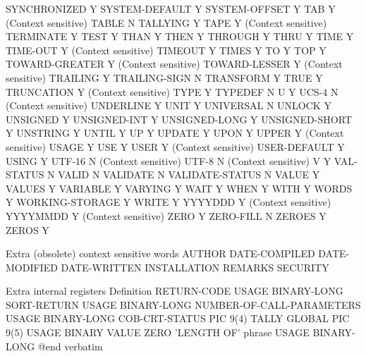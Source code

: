 SYNCHRONIZED			Y
SYSTEM-DEFAULT			Y
SYSTEM-OFFSET			Y
TAB				Y (Context sensitive)
TABLE				N
TALLYING			Y
TAPE				Y (Context sensitive)
TERMINATE			Y
TEST				Y
THAN				Y
THEN				Y
THROUGH				Y
THRU				Y
TIME				Y
TIME-OUT			Y (Context sensitive)
TIMEOUT				Y
TIMES				Y
TO				Y
TOP				Y
TOWARD-GREATER			Y (Context sensitive)
TOWARD-LESSER			Y (Context sensitive)
TRAILING			Y
TRAILING-SIGN			N
TRANSFORM			Y
TRUE				Y
TRUNCATION			Y (Context sensitive)
TYPE				Y
TYPEDEF				N
U				Y
UCS-4				N (Context sensitive)
UNDERLINE			Y
UNIT				Y
UNIVERSAL			N
UNLOCK				Y
UNSIGNED			Y
UNSIGNED-INT			Y
UNSIGNED-LONG			Y
UNSIGNED-SHORT			Y
UNSTRING			Y
UNTIL				Y
UP				Y
UPDATE				Y
UPON				Y
UPPER				Y (Context sensitive)
USAGE				Y
USE				Y
USER				Y (Context sensitive)
USER-DEFAULT			Y
USING				Y
UTF-16				N (Context sensitive)
UTF-8				N (Context sensitive)
V				Y
VAL-STATUS			N
VALID				N
VALIDATE			N
VALIDATE-STATUS			N
VALUE				Y
VALUES				Y
VARIABLE			Y
VARYING				Y
WAIT				Y
WHEN				Y
WITH				Y
WORDS				Y
WORKING-STORAGE			Y
WRITE				Y
YYYYDDD				Y (Context sensitive)
YYYYMMDD			Y (Context sensitive)
ZERO				Y
ZERO-FILL			N
ZEROES				Y
ZEROS				Y

Extra (obsolete) context sensitive words
AUTHOR
DATE-COMPILED
DATE-MODIFIED
DATE-WRITTEN
INSTALLATION
REMARKS
SECURITY

Extra internal registers	Definition
RETURN-CODE			USAGE BINARY-LONG
SORT-RETURN			USAGE BINARY-LONG
NUMBER-OF-CALL-PARAMETERS	USAGE BINARY-LONG
COB-CRT-STATUS			PIC 9(4)
TALLY				GLOBAL PIC 9(5) USAGE BINARY VALUE ZERO
'LENGTH OF' phrase		USAGE BINARY-LONG
@end verbatim


